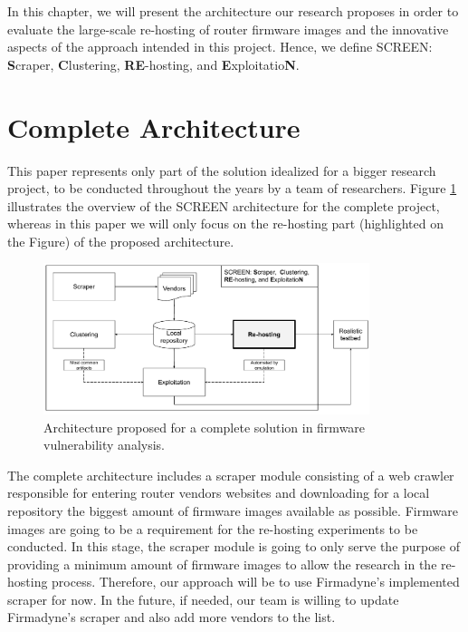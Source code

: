 In this chapter, we will present the architecture our research proposes in order to evaluate the large-scale re-hosting of router firmware images and the innovative aspects of the approach intended in this project. Hence, we define SCREEN: {\bf S}craper, {\bf C}lustering, {\bf RE}-hosting, and {\bf E}xploitatio{\bf N}.

\section{Complete Architecture}
This paper represents only part of the solution idealized for a bigger research project, to be conducted throughout the years by a team of researchers. Figure \ref{fig:architecture} illustrates the overview of the SCREEN architecture for the complete project, whereas in this paper we will only focus on the re-hosting part (highlighted on the Figure) of the proposed architecture.

\begin{figure}[h]
    \centering
    \includegraphics[width=0.85\textwidth]{figs/screen.pdf}
    \caption{Architecture proposed for a complete solution in firmware vulnerability analysis.}
    \label{fig:architecture}
\end{figure}

The complete architecture includes a scraper module consisting of a web crawler responsible for entering router vendors websites and downloading for a local repository the biggest amount of firmware images available as possible. Firmware images are going to be a requirement for the re-hosting experiments to be conducted. In this stage, the scraper module is going to only serve the purpose of providing a minimum amount of firmware images to allow the research in the re-hosting process. Therefore, our approach will be to use Firmadyne's \cite{firmadyne} implemented scraper for now. In the future, if needed, our team is willing to update Firmadyne's \cite{firmadyne} scraper and also add more vendors to the list.

